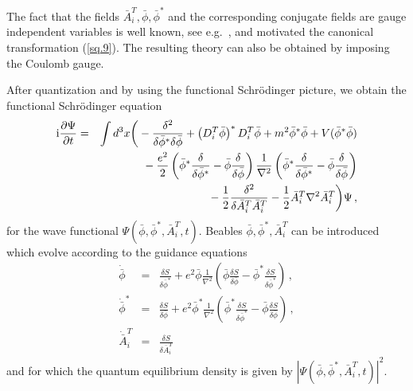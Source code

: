 \documentclass[12pt]{article}
\def\ii{\textrm i}
\begin{document}
The fact that the fields ${\bar A}^T_i,{\bar \phi},{\bar \phi}^*$ and the corresponding conjugate fields are gauge independent variables is well known, see e.g.\ \cite[pp.\ 302-306]{dirac67}, and motivated the canonical transformation (\ref{sq.9}). The resulting theory can also be obtained by imposing the Coulomb gauge.

After quantization and by using the functional Schr\"odinger picture, we obtain the functional Schr\"odinger equation 
\begin{eqnarray}
\ii\frac{\partial \Psi}{\partial t} &=&   \int d^3 x \bigg(-\frac{ \delta^2  }{ \delta {\bar \phi}^* \delta {\bar \phi}} + \left(D^T_{i} {\bar \phi}  \right)^{*}  D^T_{i} {\bar \phi}  + m^2 {\bar \phi}^* {\bar \phi} + V({\bar \phi}^*{\bar \phi})   \nonumber\\
&& \mbox{}- \frac{e^2}{2} \left({\bar \phi}^* \frac{ \delta  }{ \delta {\bar \phi}^*} -  {\bar \phi} \frac{ \delta }{ \delta {\bar \phi}} \right) \frac{1}{\nabla^2} \left({\bar \phi}^* \frac{ \delta  }{ \delta {\bar \phi}^*} -  {\bar \phi} \frac{ \delta }{ \delta {\bar \phi}} \right) \nonumber\\
&& \mbox{}- \frac{1}{2} \frac{\delta^2}{ \delta {\bar A}^T_i {\bar A}^T_i} -  \frac{1}{2} {\bar A}^T_i \nabla^2 {\bar A}^T_i \bigg)\Psi \,,
\label{sq.11}
\end{eqnarray}
for the wave functional $\Psi({\bar \phi},{\bar \phi}^*,{\bar A}^T_i,t)$. Beables ${\bar \phi},{\bar \phi}^*,{\bar A}^T_i $ can be introduced which evolve according to the guidance equations
\begin{eqnarray}
{\dot{\bar \phi} }  &=&  \frac{\delta S}{\delta {\bar \phi}^* }  + e^2  {\bar \phi} \frac{1}{\nabla^2} \left(  {\bar \phi}\frac{\delta S}{\delta {\bar \phi} } - {\bar \phi}^*\frac{\delta S}{\delta {\bar \phi}^* } \right) \,,  \nonumber\\ 
{\dot{\bar \phi} }^*  &=&  \frac{\delta S}{\delta {\bar \phi} }  + e^2  {\bar \phi}^* \frac{1}{\nabla^2} \left( {\bar \phi}^*\frac{\delta S}{\delta {\bar \phi}^* }  - {\bar \phi}\frac{\delta S}{\delta {\bar \phi} } \right) \,,  \nonumber\\ 
{\dot{\bar A}^T_i } &=&  \frac{\delta S}{\delta {\bar A}^T_i  }
\label{sq.12}
\end{eqnarray}
and for which the quantum equilibrium density is given by $|\Psi({\bar \phi},{\bar \phi}^*,{\bar A}^T_i,t)|^2$.


\end{document}
